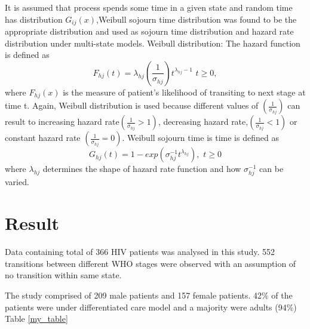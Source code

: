 \documentclass[11pt]{article}
\begin{document}
	It is assumed that process spends some time in a given state and random time has distribution $G_{ij}(x)$,Weibull sojourn time distribution was found to be the appropriate distribution and used as sojourn time distribution and hazard rate distribution under multi-state models. Weibull distribution: The hazard function is defined as 
	$$\displaystyle F_{hj}(t)=\lambda_{hj}\left(\frac{1}{\sigma_{hj}}\right)t^{\lambda _{h j}-1}\,\,t\geq 0,$$
	where  $F_{hj}(x)$ is the measure of patient's likelihood of transiting to next stage at time t. Again, Weibull distribution is used because different values of $\left(\frac{1}{\sigma_{hj}}\right)$ can result to increasing hazard rate$\left(\frac{1}{\sigma_{hj}}>1\right)$, decreasing hazard rate,$\left(\frac{1}{\sigma_{hj}}<1\right)$ or constant hazard rate $\left(\frac{1}{\sigma_{hj}}=0\right)$. 
	Weibull sojourn time is time is defined as 
	$$G_{hj}(t)=1- exp(\sigma^{-1}_{hj}t^{\lambda_{hj}}),\,\, t\geq 0$$
	where $\lambda_{hj}$ determines the shape of hazard rate function and how $\sigma^{-1}_{hj}$ can be varied. 
	\label{methods}
	
	
	
	\section{Result}\label{result}
	Data containing total of 366 HIV patients was analysed in this study. 552 transitions between different WHO stages were observed with an assumption of no transition within same state. 
	
	The study comprised of 209 male patients and 157 female patients. 42\% of the patients were under differentiated care model and a majority were adults (94\%) Table \ref{my_table}
	
\end{document}
